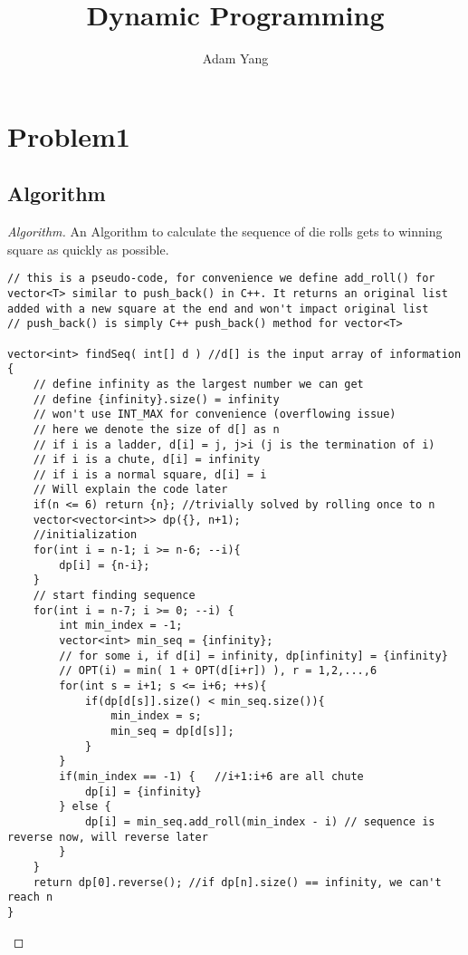 \documentclass[openany]{article}
\begin{document}
\title{Dynamic Programming}
\author{Adam Yang}
\maketitle




\section*{Problem1}

\subsection*{Algorithm}
\begin{proof}[Algorithm]{}
		\renewcommand{\qedsymbol}{}
		An Algorithm to calculate the sequence of die rolls gets to winning square as quickly as possible.
		\begin{lstlisting}[basicstyle=\fontsize{8}{9}\selectfont\ttfamily]
// this is a pseudo-code, for convenience we define add_roll() for vector<T> similar to push_back() in C++. It returns an original list added with a new square at the end and won't impact original list
// push_back() is simply C++ push_back() method for vector<T>

vector<int> findSeq( int[] d ) //d[] is the input array of information
{
    // define infinity as the largest number we can get
    // define {infinity}.size() = infinity
    // won't use INT_MAX for convenience (overflowing issue)
    // here we denote the size of d[] as n
    // if i is a ladder, d[i] = j, j>i (j is the termination of i)
    // if i is a chute, d[i] = infinity
    // if i is a normal square, d[i] = i
    // Will explain the code later
    if(n <= 6) return {n}; //trivially solved by rolling once to n
    vector<vector<int>> dp({}, n+1);
    //initialization
    for(int i = n-1; i >= n-6; --i){
        dp[i] = {n-i};
    }
    // start finding sequence
    for(int i = n-7; i >= 0; --i) {
        int min_index = -1;
        vector<int> min_seq = {infinity};
        // for some i, if d[i] = infinity, dp[infinity] = {infinity}
        // OPT(i) = min( 1 + OPT(d[i+r]) ), r = 1,2,...,6
        for(int s = i+1; s <= i+6; ++s){
            if(dp[d[s]].size() < min_seq.size()){
                min_index = s;
                min_seq = dp[d[s]];
            }
        }
        if(min_index == -1) {   //i+1:i+6 are all chute
            dp[i] = {infinity}
        } else {
            dp[i] = min_seq.add_roll(min_index - i) // sequence is reverse now, will reverse later
        }
    }
    return dp[0].reverse(); //if dp[n].size() == infinity, we can't reach n
}
		\end{lstlisting} 
\end{proof}
\end{document}

